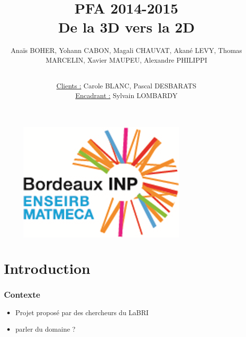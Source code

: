 \documentclass{beamer}
\title[PFA 2014-2015]{PFA 2014-2015 \\ \LARGE De la 3D vers la 2D} %
\author{Anaïs BOHER, Yohann CABON, Magali CHAUVAT, Akané LEVY, Thomas MARCELIN, Xavier MAUPEU, Alexandre PHILIPPI
\\ \and \\
\underline{Clients :} Carole BLANC, Pascal DESBARATS 
\\
\underline{Encadrant :} Sylvain LOMBARDY}
\institute[Enseirb-Matmeca] %
{École Nationale Supérieure d'Électronique, Informatique, Télécommunications, Mathématiques et Mécanique de Bordeaux
}
\date{} %
\begin{document}
\graphicspath{{./images/}{.}}





\begin{frame}
\titlepage %

\begin{figure}[B]
\vspace*{-1cm}
\includegraphics[scale=0.4]{logo.png}
\end{figure}
\end{frame}



\section{Introduction}
\begin{frame}
\frametitle{Contexte}

\begin{itemize}[label=$\bullet$]
\item Projet proposé par des chercheurs du LaBRI
\item parler du domaine ?
\end{itemize}
\end{frame}


\end{document}
